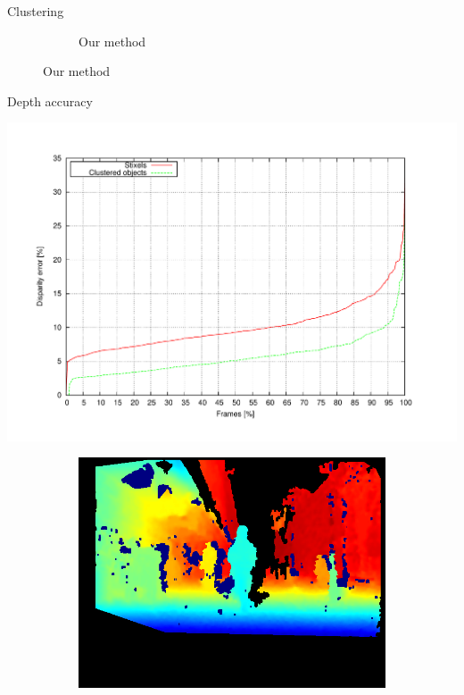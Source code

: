 \begin{frame}[plain]{Clustering}
\begin{center}
{\begin{figure}
\begin{subfigure}[b]{0.5\columnwidth}
	\caption*{Our method}
      \end{subfigure}%
    \end{figure}
    }
  \end{center}
\end{frame}

\begin{frame}[plain]{Depth accuracy}
  \begin{center}
    \vskip-0.25cm
    \includegraphics[width=\textwidth,height=0.55\textwidth,trim=50 40 80 60,clip]{disparity}
    \vskip-0.5cm
    \begin{figure}
	  \centering
	  \begin{subfigure}[b]{0.3\textwidth}
	      \includegraphics[height=0.3\figuresheight]{elas}
	  \end{subfigure}%
	  \begin{subfigure}[b]{0.3\textwidth}

\end{subfigure}
\end{figure}
\end{center}
\end{frame}
